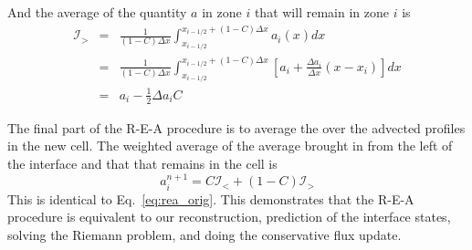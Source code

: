 And the average of the quantity $a$ in zone $i$ that will remain in zone $i$
is
\begin{eqnarray}
\mathcal{I}_> &=& \frac{1}{(1-C) \Delta x} 
   \int_{x_{i-1/2}}^{x_{i-1/2} + (1-C) \Delta x} a_{i}(x) dx \\
%
 &=& \frac{1}{(1-C) \Delta x} 
   \int_{x_{i-1/2}}^{x_{i-1/2} + (1-C)\Delta x} 
        \left [ a_{i} + \frac{\Delta a_{i}}{\Delta x} (x - x_{i} ) \right ] dx  \\
 &=& a_{i} - \frac{1}{2} \Delta a_{i} C
\end{eqnarray}

The final part of the R-E-A procedure is to average the over the 
advected profiles in the new cell.  The weighted average of the
average brought in from the left of the interface and that that remains
in the cell is
\begin{equation}
a_i^{n+1} = C \mathcal{I}_< + (1 - C) \mathcal{I}_> 
\end{equation}          
This is identical to Eq.~\ref{eq:rea_orig}.  This demonstrates that the
R-E-A procedure is equivalent to our reconstruction, prediction of the
interface states, solving the Riemann problem, and doing the 
conservative flux update.

